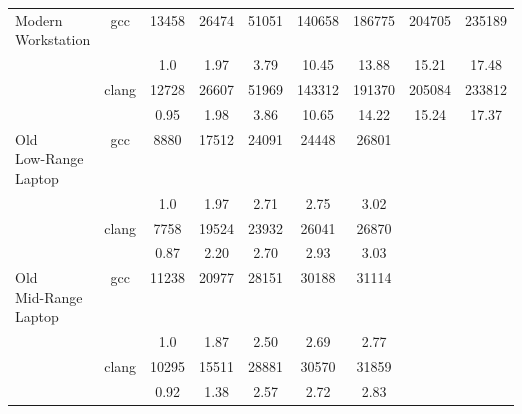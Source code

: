 \begin{table}[H]
\begin{tabularx}{\linewidth}{X c c c c c c c c}
            \midrule
\multirowcell{4}{Modern\\ Workstation} & 
\multirow{2}{*}{gcc} & 13458 & 26474 & 51051 & 140658 & 186775 & 204705 & 235189\\
 & & 1.0 & 1.97 & 3.79 & 10.45 & 13.88 & 15.21 & 17.48\\
\cmidrule[0.05em](){3-9} & 
\multirow{2}{*}{clang} & 12728 & 26607 & 51969 & 143312 & 191370 & 205084 & 233812\\
 & & 0.95 & 1.98 & 3.86 & 10.65 & 14.22 & 15.24 & 17.37\\
            \midrule
\multirowcell{4}{Old\\ Low-Range\\ Laptop} & 
\multirow{2}{*}{gcc} & 8880 & 17512 & 24091 & 24448 & 26801\\
 & & 1.0 & 1.97 & 2.71 & 2.75 & 3.02\\
\cmidrule[0.05em](){3-9} & 
\multirow{2}{*}{clang} & 7758 & 19524 & 23932 & 26041 & 26870\\
 & & 0.87 & 2.20 & 2.70 & 2.93 & 3.03\\
            \midrule
\multirowcell{4}{Old\\ Mid-Range\\ Laptop} & 
\multirow{2}{*}{gcc} & 11238 & 20977 & 28151 & 30188 & 31114\\
 & & 1.0 & 1.87 & 2.50 & 2.69 & 2.77\\
\cmidrule[0.05em](){3-9} & 
\multirow{2}{*}{clang} & 10295 & 15511 & 28881 & 30570 & 31859\\
 & & 0.92 & 1.38 & 2.57 & 2.72 & 2.83 \\
            \bottomrule
        \end{tabularx}
    \end{table}
    